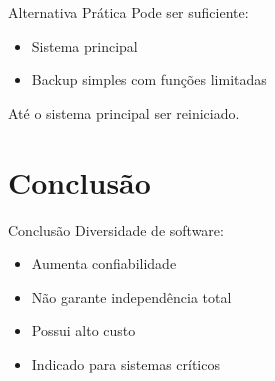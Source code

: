 \documentclass[9pt]{beamer}
\begin{document}

\begin{frame}{Alternativa Prática}
Pode ser suficiente:

\begin{itemize}
\item Sistema principal
\item Backup simples com funções limitadas
\end{itemize}

Até o sistema principal ser reiniciado.
\end{frame}

\section{Conclusão}

\begin{frame}{Conclusão}
Diversidade de software:

\begin{itemize}
\item Aumenta confiabilidade
\item Não garante independência total
\item Possui alto custo
\item Indicado para sistemas críticos
\end{itemize}
\end{frame}
\end{document}

